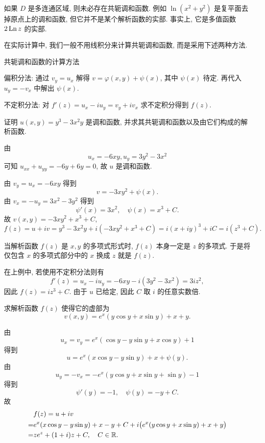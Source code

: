 如果 $D$ 是多连通区域, 则未必存在共轭调和函数.
例如 $\ln(x^2+y^2)$ 是复平面去掉原点上的调和函数, 但它并不是某个解析函数的实部.
事实上, 它是多值函数 $2\operatorname{Ln} z$ 的实部.

在实际计算中, 我们一般不用线积分来计算共轭调和函数, 而是采用下述两种方法.
\begin{fifth}{共轭调和函数的计算方法}
  \begin{enumpar}
    \item \alert{偏积分法}: 通过 $v_y=u_x$ 解得 $v=\varphi(x,y)+\psi(x)$, 其中 $\psi(x)$ 待定. 再代入 $u_y=-v_x$ 中解出 $\psi(x)$.
    \item \alert{不定积分法}: 对 $f'(z)=u_x-iu_y=v_y+iv_x$ 求不定积分得到 $f(z)$.
  \end{enumpar}
\end{fifth}

\begin{example}
  证明 $u(x,y)=y^3-3x^2y$ 是调和函数, 并求其共轭调和函数以及由它们构成的解析函数.
\end{example}

\begin{solution}
  由
  \[
    u_x=-6xy,u_y=3y^2-3x^2
  \]
  可知 $u_{xx}+u_{yy}=-6y+6y=0$, 故 $u$ 是调和函数.

  由 $v_y=u_x=-6xy$ 得到
  \[
    v=-3xy^2+\psi(x).
  \]
  由 $v_x=-u_y=3x^2-3y^2$ 得到
  \[
    \psi'(x)=3x^2,\quad \psi(x)=x^3+C.
  \]
  故 $v(x,y)=-3xy^2+x^3+C$,
  \[
    f(z)=u+iv=y^3-3x^2y+i(-3xy^2+x^3+C)
    =i(x+iy)^3+iC=i(z^3+C).
  \]
\end{solution}

当解析函数 $f(z)$ 是 $x,y$ 的多项式形式时, $f(z)$ 本身一定是 $z$ 的多项式.
于是将仅包含 $x$ 的多项式部分中的 $x$ 换成 $z$ 就是 $f(z)$.

在上例中, 若使用不定积分法则有
\[
  f'(z)=u_x-iu_y=-6xy-i(3y^2-3x^2)=3iz^2,
\]
因此 $f(z)=iz^3+C$. 由于 $u$ 已给定, 因此 $C$ 取 $i$ 的任意实数倍.

\begin{example}
  求解析函数 $f(z)$ 使得它的虚部为
  \[
    v(x,y)=e^x(y\cos y+x\sin y)+x+y.
  \]
\end{example}

\begin{solution}
  由
  \[
    u_x=v_y=e^x(\cos y-y\sin y+x\cos y)+1
  \]
  得到
  \[
    u=e^x(x\cos y-y\sin y)+x+\psi(y).
  \]
  由
  \[
    u_y=-v_x=-e^x(y\cos y+x\sin y+\sin y)-1
  \]
  得到
  \[
    \psi'(y)=-1,\quad\psi(y)=-y+C.
  \]
  故
  \begin{align*}
    &f(z)=u+iv\\
    =&e^x(x\cos y-y\sin y)+x-y+C+i\bigl(e^x(y\cos y+x\sin y)+x+y\bigr)\\
    =&ze^z+(1+i)z+C,\quad C\in{\mathbb{R}}.
  \end{align*}
\end{solution}

